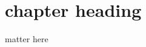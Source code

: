 \documentclass[12pt, a4paper]{report}
\begin{document}
\pagestyle{plain}
\def\title{Metasploit Framework}
\def\what{CS 694: Seminar}
\def\who{Saurabh Jambhule (153050097)}
\def\guide{Prof. Sivakumar G. }

\titlpage
\tableofcontents
\listoffigures


\newpage
{}



\chapter{chapter heading}

matter here
% 
%
%
%
\end{document}
